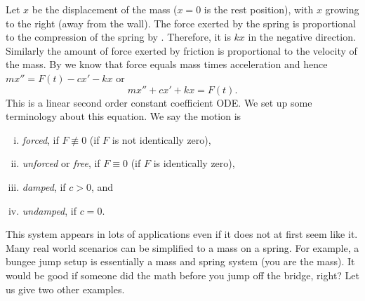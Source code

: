 Let $x$ be the displacement of the mass ($x=0$ is the rest position), with
$x$ growing to the right (away from the wall).
The force exerted by the spring is proportional to the
compression of the spring by .
Therefore, it is $kx$ in the negative direction.
Similarly the amount of force exerted by friction is proportional
to the velocity of the mass.
By  we know that force equals mass times acceleration
and hence $mx'' = F(t)-cx'-kx$ or
\begin{equation*}
mx'' + cx' + kx = F(t) .
\end{equation*}
This is a linear second order constant coefficient ODE.  We set up some
terminology about this equation.  We say the motion is
\begin{enumerate}[(i)]
\item \emph{forced}, if $F \not\equiv 0$ (if $F$ is not identically zero),
\item \emph{unforced} or \emph{free}, if $F \equiv 0$ (if $F$ is identically zero),
\item \emph{damped}, if $c > 0$, and
\item \emph{undamped}, if $c = 0$.
\end{enumerate}

This system appears in lots of applications even if it does not at first
seem like it.  Many real world scenarios can be simplified to
a mass on a spring.  For example, a bungee jump setup is essentially a mass
and spring system (you are the mass).  It would be good if someone did the math
before you jump off the bridge, right?  Let us give two other examples.

\medskip

